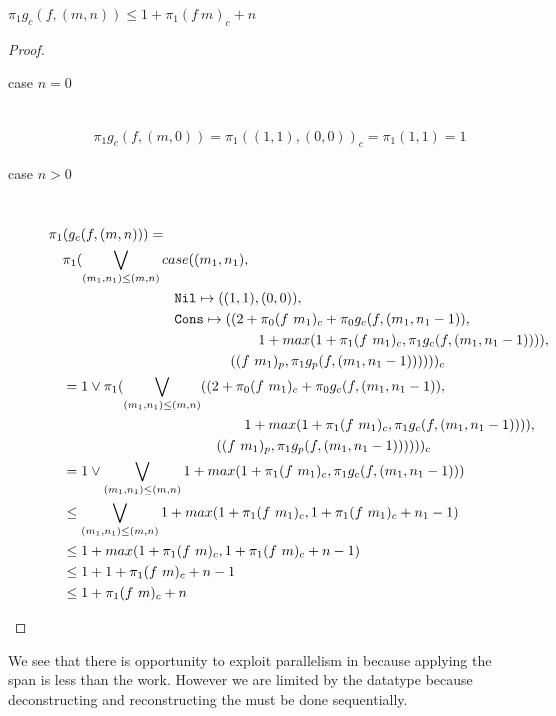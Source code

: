 %
\begin{lemma}
  $\pi_1 g_c(f, (m, n)) \leq 1 + \pi_1 (f\ m)_c + n$
\end{lemma}
%
\begin{proof}
  \begin{description}
    \item[case $n=0$]\mbox{}\\[-1.5\baselineskip]
      \begin{align*}
      \pi_1 g_c(f, (m, 0)) = \pi_1((1, 1), (0, 0))_c = \pi_1(1, 1) = 1
      \end{align*}
    \item[case $n>0$]\mbox{}\\[-1.5\baselineskip]
      \[\begin{split}
        &\pi_1(g_c(f, (m, n))) = \\
        &\quad \pi_1(\bigvee\limits_{(m_1, n_1) \leq (m, n)} case((m_1, n_1), \\
        &\quadfive\quadfour \T{Nil} \mapsto ((1, 1), (0, 0)), \\
        &\quadfive\quadfour \T{Cons} \mapsto ((2 + \pi_0(f\ m_1)_c + \pi_0g_c(f, (m_1, n_1-1)), \\
        &\quadfive\quadten                     1 + max(1 + \pi_1(f\ m_1)_c, \pi_1g_c(f, (m_1, n_1-1)))), \\
        &\quadfive\quadeight                  ((f\ m_1)_p, \pi_1 g_p(f, (m_1, n_1-1))))) )_c \\
        &\quad = 1 \vee \pi_1(\bigvee\limits_{(m_1, n_1) \leq (m, n)} ((2 + \pi_0(f\ m_1)_c + \pi_0g_c(f, (m_1, n_1-1)), \\
        &\quadfour\quadten                     1 + max(1 + \pi_1(f\ m_1)_c, \pi_1g_c(f, (m_1, n_1-1)))), \\
        &\quadfour\quadeight                  ((f\ m_1)_p, \pi_1 g_p(f, (m_1, n_1-1))))) )_c \\
        &\quad = 1 \vee \bigvee\limits_{(m_1, n_1) \leq (m, n)} 1 + max(1 + \pi_1 (f\ m_1)_c, \pi_1 g_c(f, (m_1, n_1-1))) \\
        &\quad \leq \bigvee\limits_{(m_1, n_1) \leq (m, n)} 1 + max(1 + \pi_1 (f\ m_1)_c, 1 + \pi_1 (f\ m_1)_c + n_1 - 1) \\
        &\quad \leq 1 + max(1 + \pi_1 (f\ m)_c, 1 + \pi_1 (f\ m)_c + n - 1) \\
        &\quad \leq 1 + 1 + \pi_1 (f\ m)_c + n - 1 \\
        &\quad \leq 1 + \pi_1 (f\ m)_c + n
      \end{split}\]
  \end{description}
\end{proof}
%
We see that there is opportunity to exploit parallelism in  because
applying the span is less than the work. However we are limited by the 
datatype because deconstructing and reconstructing the  must be done
sequentially.

